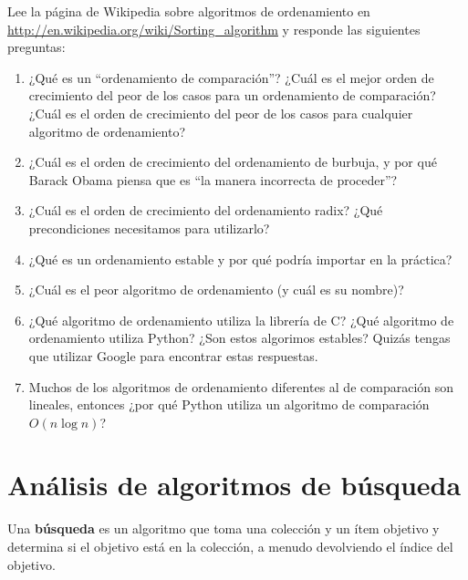 \documentclass[10pt]{book}
\begin{document}
\begin{exercise}

Lee la página de Wikipedia sobre algoritmos de ordenamiento en
\url{http://en.wikipedia.org/wiki/Sorting_algorithm} y responde
las siguientes preguntas:

\begin{enumerate}

\item ¿Qué es un ``ordenamiento de comparación''? ¿Cuál es el mejor orden de crecimiento
  del peor de los casos para un ordenamiento de comparación?  ¿Cuál es el orden de crecimiento
  del peor de los casos para cualquier algoritmo de ordenamiento?

\item ¿Cuál es el orden de crecimiento del ordenamiento de burbuja, y por qué Barack
  Obama piensa que es ``la manera incorrecta de proceder''?

\item ¿Cuál es el orden de crecimiento del ordenamiento radix?  ¿Qué precondiciones
  necesitamos para utilizarlo?

\item ¿Qué es un ordenamiento estable y por qué podría importar en la práctica?

\item ¿Cuál es el peor algoritmo de ordenamiento (y cuál es su nombre)?

\item ¿Qué algoritmo de ordenamiento utiliza la librería de C?  ¿Qué algoritmo de ordenamiento
  utiliza Python?  ¿Son estos algorimos estables?  Quizás tengas que
  utilizar Google para encontrar estas respuestas.

\item Muchos de los algoritmos de ordenamiento diferentes al de comparación son lineales, entonces ¿por qué
  Python utiliza un algoritmo de comparación $O(n \log n)$?

\end{enumerate}

\end{exercise}


\section{Análisis de algoritmos de búsqueda}

Una {\bf búsqueda} es un algoritmo que toma una colección y un ítem objetivo
y determina si el objetivo está en la colección, a menudo
devolviendo el índice del objetivo.
\end{document}
